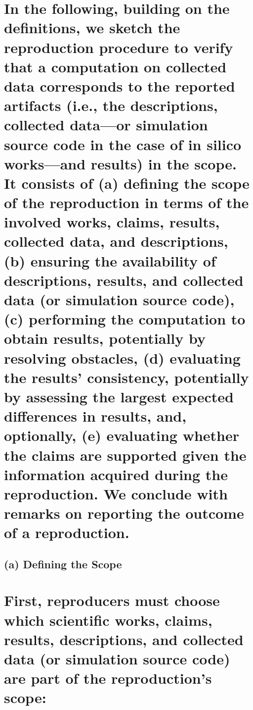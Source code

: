 \documentclass[authordate, empirical]{jote-new-article}
\begin{document}
	\section{In the following, building on the definitions, we sketch the reproduction procedure to verify that a computation on collected data corresponds to the reported artifacts (i.e., the descriptions, collected data—or simulation source code in the case of in silico works—and results) in the scope. It consists of (a) defining the scope of the reproduction in terms of the involved works, claims, results, collected data, and descriptions, (b) ensuring the availability of descriptions, results, and collected data (or simulation source code), (c) performing the computation to obtain results, potentially by resolving obstacles, (d) evaluating the results' consistency, potentially by assessing the largest expected differences in results, and, optionally, (e) evaluating whether the claims are supported given the information acquired during the reproduction. We conclude with remarks on reporting the outcome of a reproduction.}



	\subsection{(a) Defining the Scope}



	\section{First, reproducers must choose which scientific works, claims, results, descriptions, and collected data (or simulation source code) are part of the reproduction's scope:}
\end{document}
